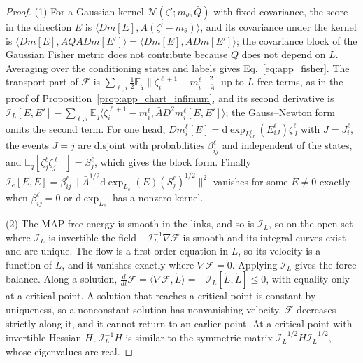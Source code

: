 \documentclass[twoside,11pt]{article}
\begin{document}
\begin{proof}
(1) For a Gaussian kernel $\mathcal N(\zeta';m_\theta,\bar Q)$ with fixed covariance, the score in the direction $E$ is $\langle Dm[E],\bar A(\zeta'-m_\theta)\rangle$, and its covariance under the kernel is $\langle Dm[E],\bar A\bar Q\bar ADm[E']\rangle=\langle Dm[E],\bar ADm[E']\rangle$; the covariance block of the Gaussian Fisher metric does not contribute because $\bar Q$ does not depend on $L$. Averaging over the conditioning states and labels gives Eq.~\eqref{eq:app_fisher}. The transport part of $\mathcal F$ is $\sum_{\ell,i}\tfrac12\mathbb E_q\|\zeta_i^{\ell+1}-m_i^\ell\|_{\bar A}^2$ up to $L$-free terms, as in the proof of Proposition~\ref{prop:app_chart_infimum}, and its second derivative is $\mathcal I_L[E,E']-\sum_{\ell,i}\mathbb E_q\langle\zeta_i^{\ell+1}-m_i^\ell,\bar AD^2m_i^\ell[E,E']\rangle$; the Gauss--Newton form omits the second term. For one head, $Dm_i^\ell[E]=\mathrm d\exp_{L_{iJ}^\ell}(E_{iJ}^\ell)\zeta_J^\ell$ with $J=J_i^\ell$, the events $J=j$ are disjoint with probabilities $\beta_{ij}^\ell$ and independent of the states, and $\mathbb E_q[\zeta_j^\ell\zeta_j^{\ell\top}]=S_j^\ell$, which gives the block form. Finally $\mathcal I_e[E,E]=\beta_{ij}^\ell\|\bar A^{1/2}\mathrm d\exp_{L_e}(E)(S_j^\ell)^{1/2}\|^2$ vanishes for some $E\ne0$ exactly when $\beta_{ij}^\ell=0$ or $\mathrm d\exp_{L_e}$ has a nonzero kernel.

(2) The MAP free energy is smooth in the links, and so is $\mathcal I_L$, so on the open set where $\mathcal I_L$ is invertible the field $-\mathcal I_L^{-1}\nabla\mathcal F$ is smooth and its integral curves exist and are unique. The flow is a first-order equation in $L$, so its velocity is a function of $L$, and it vanishes exactly where $\nabla\mathcal F=0$. Applying $\mathcal I_L$ gives the force balance. Along a solution, $\tfrac{d}{dt}\mathcal F=\langle\nabla\mathcal F,\dot L\rangle=-\mathcal I_L[\dot L,\dot L]\le0$, with equality only at a critical point. A solution that reaches a critical point is constant by uniqueness, so a nonconstant solution has nonvanishing velocity, $\mathcal F$ decreases strictly along it, and it cannot return to an earlier point. At a critical point with invertible Hessian $H$, $\mathcal I_L^{-1}H$ is similar to the symmetric matrix $\mathcal I_L^{-1/2}H\mathcal I_L^{-1/2}$, whose eigenvalues are real.
\end{proof}
\end{document}

